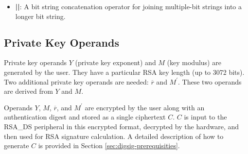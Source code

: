 \documentclass[main\_\_EN.tex]{subfiles}
\begin{document}
\begin{itemize}
    \item {\bfseries ||}:
       A bit string concatenation operator for joining multiple-bit strings into a longer bit string.
\end{itemize}

\subsection{Private Key Operands}
\label{sec:digsig-private-key-operands}

Private key operands \begin{math}Y\end{math} (private key exponent) and \begin{math}M\end{math} (key modulus) are generated by the user. They have a particular RSA key length (up to 3072 bits).
Two additional private key operands are needed: \begin{math}\overline{r}\end{math} and \begin{math}M^{\prime}\end{math}. These two operands are derived from \begin{math}Y\end{math} and \begin{math}M\end{math}.

Operands \begin{math}Y\end{math}, \begin{math}M\end{math}, \begin{math}\overline{r}\end{math}, and \begin{math}M^{\prime}\end{math} are encrypted by the user along with an authentication digest and stored as a single ciphertext \begin{math}C\end{math}. \begin{math}C\end{math} is input to the RSA\_DS peripheral in this encrypted format, decrypted by the hardware, and then used for RSA signature calculation. A detailed description of how to generate \begin{math}C\end{math} is provided in Section \ref{sec:digsig-prerequisities}.
\end{document}
